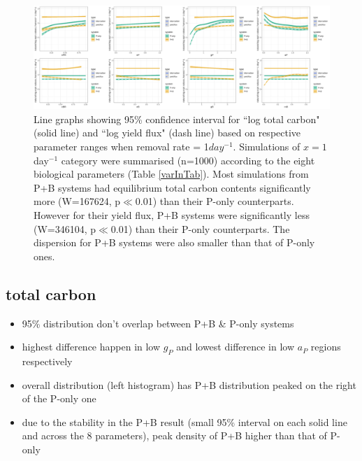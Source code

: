 \documentclass[../thesis.tex]{subfiles} %
\begin{document}
\begin{figure}[H]
    \centering
    \includegraphics[width=\linewidth]{../result/var_10.png}
    \caption[95\% distribution for $x=1day^{-1}$]{Line graphs showing 95\% confidence interval for ``log total carbon" (solid line) and ``log yield flux" (dash line) based on respective parameter ranges when removal rate = 1$day^{-1}$.  {\scriptsize Simulations of $x=1$day$^{-1}$ category were summarised (n=1000) according to the eight biological parameters (Table \ref{varInTab}).  Most simulations from P+B systems had equilibrium total carbon contents significantly more (W=167624, p$\ll$0.01) than their P-only counterparts.  However for their yield flux, P+B systems were significantly less (W=346104, p$\ll$0.01) than their P-only counterparts.  The dispersion for P+B systems were also smaller than that of P-only ones.}}
    \label{fig:v10}
\end{figure}

\subsection{total carbon}
\begin{itemize}
    \item 95\% distribution don't overlap between P+B \& P-only systems
    \item highest difference happen in low $g_P$ and lowest difference in low $a_P$ regions respectively
    \item overall distribution (left histogram) has P+B distribution peaked on the right of the P-only one
    \item due to the stability in the P+B result (small 95\% interval on each solid line and across the 8 parameters), peak density of P+B higher than that of P-only
\end{itemize}
\end{document}
